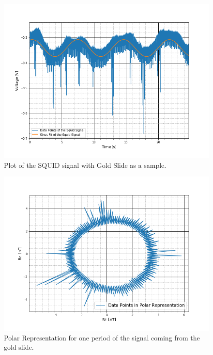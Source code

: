 \begin{figure}[ht]
	\includegraphics[scale=0.5]{Bild/P2_2}
	\centering
	\caption[SQUID signal of a Gold Slide 2]{Plot of the SQUID signal with Gold Slide as a sample.}
\end{figure}
\begin{figure}[ht]
	\includegraphics[scale=0.5]{Bild/Gold}
	\centering
	\caption[Polar Representation for Gold Slide]{Polar Representation for one period of the signal coming from the gold slide.}
\end{figure}
